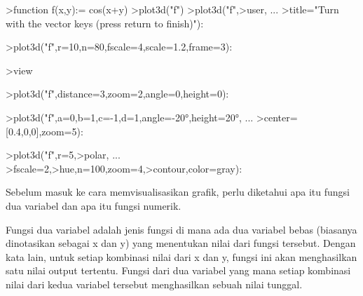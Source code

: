 \documentclass[a4paper,10pt]{article}
\begin{document}
\begin{eulernotebook}
\eulersubheading{}
\begin{eulerprompt}
>function f(x,y):= cos(x+y)
>plot3d("f")
>plot3d("f",>user, ...
>title="Turn with the vector keys (press return to finish)"):
\end{eulerprompt}
\begin{eulerprompt}
>plot3d("f",r=10,n=80,fscale=4,scale=1.2,frame=3):
\end{eulerprompt}
\begin{eulerprompt}
>view
\end{eulerprompt}
\begin{euleroutput}
  [5,  2.6,  2,  0.4]
\end{euleroutput}
\begin{eulerprompt}
>plot3d("f",distance=3,zoom=2,angle=0,height=0):
\end{eulerprompt}
\begin{eulerprompt}
>plot3d("f",a=0,b=1,c=-1,d=1,angle=-20°,height=20°, ...
>center=[0.4,0,0],zoom=5):
\end{eulerprompt}
\begin{eulerprompt}
>plot3d("f",r=5,>polar, ...
>fscale=2,>hue,n=100,zoom=4,>contour,color=gray):
\end{eulerprompt}
\begin{eulercomment}
Sebelum masuk ke cara memvisualisasikan grafik, perlu diketahui apa
itu fungsi dua variabel dan apa itu fungsi numerik.

\end{eulercomment}
\begin{eulercomment}
Fungsi dua variabel adalah jenis fungsi di mana ada dua variabel bebas
(biasanya dinotasikan sebagai x dan y) yang menentukan nilai dari
fungsi tersebut. Dengan kata lain, untuk setiap kombinasi nilai dari x
dan y, fungsi ini akan menghasilkan satu nilai output tertentu. Fungsi
dari dua variabel yang mana setiap kombinasi nilai dari kedua variabel
tersebut menghasilkan sebuah nilai tunggal.



\end{eulercomment}
\end{eulernotebook}
\end{document}
